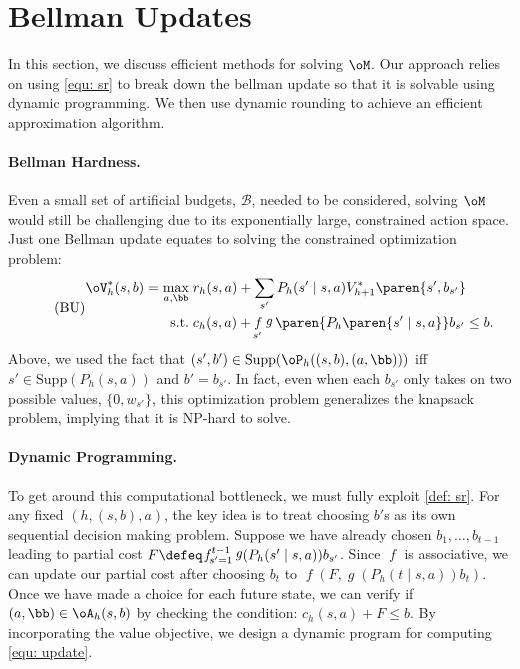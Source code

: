 \documentclass[pdftex, a4paper, 12pt]{article}
\newcommand{\supp}{\text{Supp}}
\newcommand{\mB}{\mathcal{B}}
\DeclareMathOperator*{\f}{\mathit{f}}
\DeclareMathOperator*{\g}{\mathit{g}}
\begin{document}
\section{Bellman Updates}\label{sec: bellman}
In this section, we discuss efficient methods for solving $\oM$. Our approach relies on using \eqref{equ: sr} to break down the bellman update so that it is solvable using dynamic programming. We then use dynamic rounding to achieve an efficient approximation algorithm.

\paragraph{Bellman Hardness.} 
Even a small set of artificial budgets, $\mB$, needed to be considered, solving $\oM$ would still be challenging due to its exponentially large, constrained action space. Just one Bellman update equates to solving the constrained optimization problem:
\begin{equation}\label{equ: update}\tag{BU}
    \begin{split}
        \oV^*_h(s,b) = \max_{a, \bb} \; &r_h(s,a) + \sum_{s'} P_h(s' \mid s,a) V_{h+1}^*\paren{s', b_{s'}}\\
        \text{s.t.} \; &c_h(s,a) + \f_{s'} \g\paren{P_h\paren{s' \mid s,a}}b_{s'} \leq b.
    \end{split}
\end{equation}
Above, we used the fact that $(s',b') \in \supp(\oP_h((s,b), (a,\bb)))$ iff $s' \in \supp(P_h(s,a))$ and $b' = b_{s'}$. 
In fact, even when each $b_{s'}$ only takes on two possible values, $\{0, w_{s'}\}$, this optimization problem generalizes the knapsack problem, implying that it is NP-hard to solve. 

\paragraph{Dynamic Programming.} To get around this computational bottleneck, we must fully exploit \cref{def: sr}. For any fixed $(h,(s,b),a)$, the key idea is to treat choosing $b'$s as its own sequential decision making problem. Suppose we have already chosen $b_{1}, \ldots, b_{t-1}$ leading to partial cost $F \defeq \f_{s' = 1}^{t-1} \g(P_h(s' \mid s,a)) b_{s'}$. Since $\f$ is associative, we can update our partial cost after choosing $b_{t}$ to $\f(F, \g(P_h(t \mid s,a)) b_{t})$. Once we have made a choice for each future state, we can verify if $(a,\bb) \in \oA_h(s,b)$ by checking the condition: $c_h(s,a) + F \leq b$. By incorporating the value objective, we design a dynamic program for computing \eqref{equ: update}.
\end{document}
